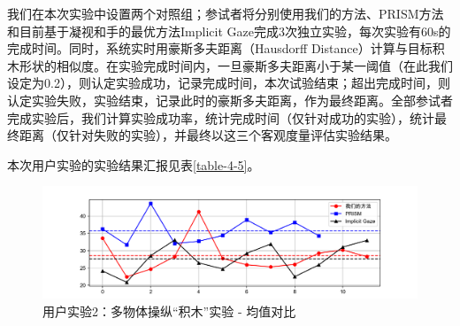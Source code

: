 我们在本次实验中设置两个对照组；参试者将分别使用我们的方法、PRISM方法和目前基于凝视和手的最优方法Implicit Gaze完成3次独立实验，每次实验有60s的完成时间。同时，系统实时用豪斯多夫距离（Hausdorff Distance）计算与目标积木形状的相似度。在实验完成时间内，一旦豪斯多夫距离小于某一阈值（在此我们设定为0.2），则认定实验成功，记录完成时间，本次试验结束；超出完成时间，则认定实验失败，实验结束，记录此时的豪斯多夫距离，作为最终距离。全部参试者完成实验后，我们计算实验成功率，统计完成时间（仅针对成功的实验），统计最终距离（仅针对失败的实验），并最终以这三个客观度量评估实验结果。

本次用户实验的实验结果汇报见表\ref{table-4-5}。

\begin{figure}[t!]
    \centering
    \includegraphics[width=\textwidth]{figure/user-study-2-avg.png}
    \caption{用户实验2：多物体操纵“积木”实验 - 均值对比}
    \label{fig-4-4}
\end{figure}

